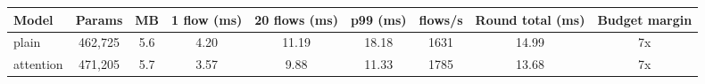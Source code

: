 \begin{tabular}{lcccccccc}
\toprule
Model & Params & MB & 1 flow (ms) & 20 flows (ms) & p99 (ms) & flows/s & Round total (ms) & Budget margin \\
\midrule
plain & 462,725 & 5.6 & 4.20 & 11.19 & 18.18 & 1631 & 14.99 & 7x \\
attention & 471,205 & 5.7 & 3.57 & 9.88 & 11.33 & 1785 & 13.68 & 7x \\
\bottomrule
\end{tabular}
